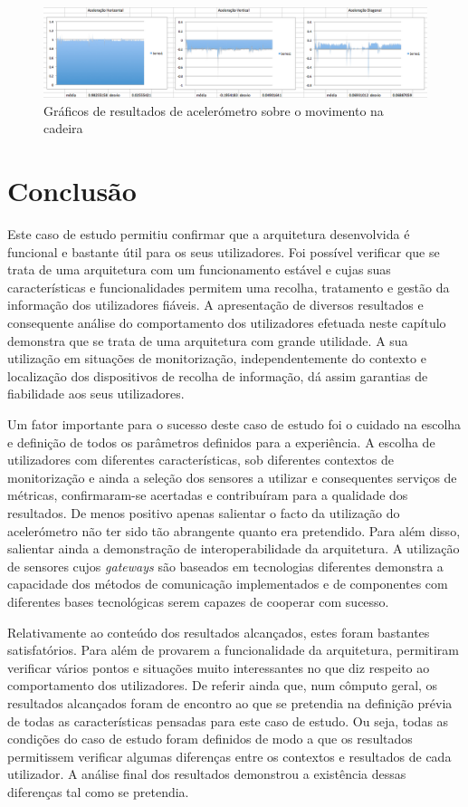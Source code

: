  \begin{figure}[htb]
   \centering
   \includegraphics[scale=0.3]{Images/aceleracao.png}
   \caption{Gráficos de resultados de acelerómetro sobre o movimento na cadeira}
\end{figure}



\section{Conclusão}

Este caso de estudo permitiu confirmar que a arquitetura desenvolvida é funcional e bastante útil para os seus utilizadores. Foi possível verificar que se trata de uma arquitetura com um funcionamento estável e cujas suas características e funcionalidades permitem uma recolha, tratamento e gestão da informação dos utilizadores fiáveis. A apresentação de diversos resultados e consequente análise do comportamento dos utilizadores efetuada neste capítulo demonstra que se trata de uma arquitetura com grande utilidade. A sua utilização em situações de monitorização, independentemente do contexto e localização dos dispositivos de recolha de informação, dá assim garantias de fiabilidade aos seus utilizadores.

Um fator importante para o sucesso deste caso de estudo foi o cuidado na escolha e definição de todos os parâmetros definidos para a experiência. A escolha de utilizadores com diferentes características, sob diferentes contextos de monitorização e ainda a seleção dos sensores a utilizar e consequentes serviços de métricas, confirmaram-se acertadas e contribuíram para a qualidade dos resultados. De menos positivo apenas salientar o facto da utilização do acelerómetro não ter sido tão abrangente quanto era pretendido. Para além disso, salientar ainda a demonstração de interoperabilidade da arquitetura. A utilização de sensores cujos \textit{gateways} são baseados em tecnologias diferentes demonstra a capacidade dos métodos de comunicação implementados e de componentes com diferentes bases tecnológicas serem capazes de cooperar com sucesso.

Relativamente ao conteúdo dos resultados alcançados, estes foram bastantes satisfatórios. Para além de provarem a funcionalidade da arquitetura, permitiram verificar vários pontos e situações muito interessantes no que diz respeito ao comportamento dos utilizadores. De referir ainda que, num cômputo geral, os resultados alcançados foram de encontro ao que se pretendia na definição prévia de todas as características pensadas para este caso de estudo. Ou seja, todas as condições do caso de estudo foram definidos de modo a que os resultados permitissem verificar algumas diferenças entre os contextos e resultados de cada utilizador. A análise final dos resultados demonstrou a existência dessas diferenças tal como se pretendia.

